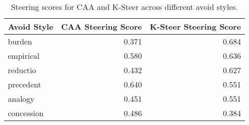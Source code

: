 \begin{table}
\centering
\caption{Steering scores for CAA and K-Steer across different avoid styles.}
\label{tab:steering_scores}
\begin{tabular}{lrr}
\toprule
Avoid Style &  CAA Steering Score &  K-Steer Steering Score \\
\midrule
     burden &               0.371 &                   0.684 \\
  empirical &               0.580 &                   0.636 \\
   reductio &               0.432 &                   0.627 \\
  precedent &               0.640 &                   0.551 \\
    analogy &               0.451 &                   0.551 \\
 concession &               0.486 &                   0.384 \\
\bottomrule
\end{tabular}
\end{table}
